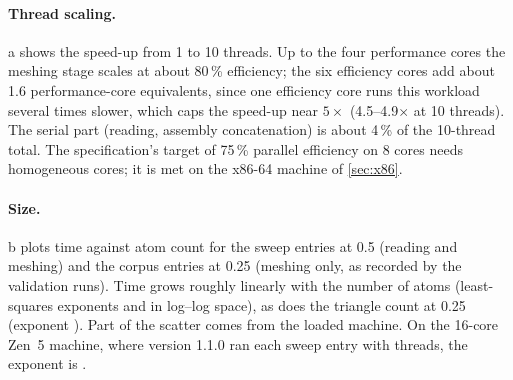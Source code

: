\paragraph{Thread scaling.}
a shows the speed-up from 1 to 10 threads. Up to the four
performance cores the meshing stage scales at about 80\,\% efficiency; the
six efficiency cores add about 1.6 performance-core equivalents, since one
efficiency core runs this workload several times slower, which caps the
speed-up near $5\times$ (4.5--4.9$\times$ at 10 threads). The serial part
(reading, assembly concatenation) is about 4\,\% of the 10-thread total.
The specification's target of 75\,\% parallel efficiency on 8 cores needs
homogeneous cores; it is met on the x86-64 machine of \cref{sec:x86}.

\paragraph{Size.}
b plots time against atom count for the
 sweep entries at 0.5\Ang{} (reading and meshing) and the
 corpus entries at 0.25\Ang{} (meshing only, as recorded by
the validation runs). Time grows roughly linearly with the number of atoms
(least-squares exponents  and
 in log--log space), as does the triangle count at
0.25\Ang{} (exponent ). Part of the scatter comes
from the loaded machine. On the 16-core Zen~5 machine, where version 1.1.0
ran each sweep entry with  threads, the exponent is
.

